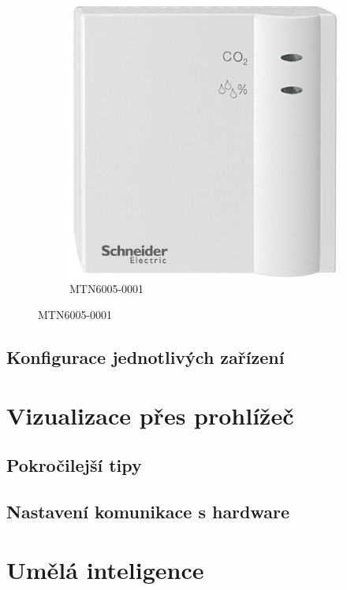 \documentclass[12pt, a4paper,
twoside,        %
openright
]{report}
\begin{document}
\begin{figure}[h]
\begin{subfigure}{0.9\textwidth}
		\centering
		\includegraphics[scale=0.085]{image/MTN6005-0001.jpg}
		\caption{MTN6005-0001}
		\label{image:13}
\end{subfigure}
\end{figure}

\section{Konfigurace jednotlivých zařízení}
\label{sec:hw_conf}


\chapter{Vizualizace přes prohlížeč}	
	
	
\section[Tvorba prostředí]{Pokročilejší tipy}
	
\section{Nastavení komunikace s hardware}
	
	
	
	
\chapter{Umělá inteligence}
\end{document}
